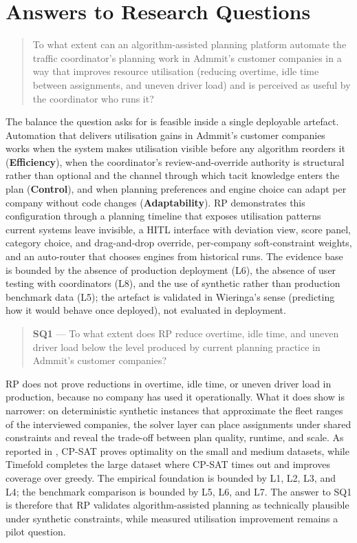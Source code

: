 \section{Answers to Research Questions}
\label{sec:answers}

\begin{quote}
To what extent can an algorithm-assisted planning platform automate the traffic coordinator's planning work in Admmit's customer companies in a way that improves resource utilisation (reducing overtime, idle time between assignments, and uneven driver load) and is perceived as useful by the coordinator who runs it?
\end{quote}

The balance the question asks for is feasible inside a single deployable artefact. Automation that delivers utilisation gains in Admmit's customer companies works when the system makes utilisation visible before any algorithm reorders it (\textbf{Efficiency}), when the coordinator's review-and-override authority is structural rather than optional and the channel through which tacit knowledge enters the plan (\textbf{Control}), and when planning preferences and engine choice can adapt per company without code changes (\textbf{Adaptability}). RP demonstrates this configuration through a planning timeline that exposes utilisation patterns current systems leave invisible, a HITL interface with deviation view, score panel, category choice, and drag-and-drop override, per-company soft-constraint weights, and an auto-router that chooses engines from historical runs. The evidence base is bounded by the absence of production deployment (L6), the absence of user testing with coordinators (L8), and the use of synthetic rather than production benchmark data (L5); the artefact is validated in Wieringa's sense (predicting how it would behave once deployed), not evaluated in deployment.

\begin{quote}
\textbf{SQ1} — To what extent does RP reduce overtime, idle time, and uneven driver load below the level produced by current planning practice in Admmit's customer companies?
\end{quote}

RP does not prove reductions in overtime, idle time, or uneven driver load in production, because no company has used it operationally. What it does show is narrower: on deterministic synthetic instances that approximate the fleet ranges of the interviewed companies, the solver layer can place assignments under shared constraints and reveal the trade-off between plan quality, runtime, and scale. As reported in , CP-SAT proves optimality on the small and medium datasets, while Timefold completes the large dataset where CP-SAT times out and improves coverage over greedy. The empirical foundation is bounded by L1, L2, L3, and L4; the benchmark comparison is bounded by L5, L6, and L7. The answer to SQ1 is therefore that RP validates algorithm-assisted planning as technically plausible under synthetic constraints, while measured utilisation improvement remains a pilot question.


